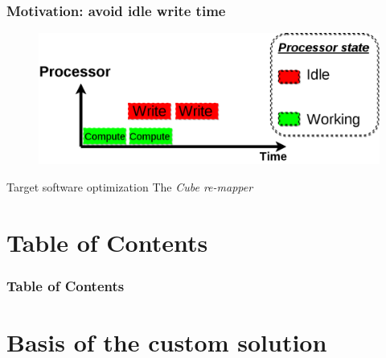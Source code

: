 \documentclass[slidestop,xcolor=dvipsnames, notes=hide]{beamer}
\newcommand{\toolTargetSoftware}			{\emph{Cube re-mapper}}
\begin{document}
	\begin{frame}
		\frametitle{Motivation: avoid idle write time}
		\center
		\begin{figure}
			\center
			\includegraphics[width=1\textwidth, height=0.6\textheight]{images/internship_juelich_cubeRemapper_pattern_ideal.png}
		\end{figure}
		
		\pause
		\begin{block}{Target software optimization}
			The \toolTargetSoftware
		\end{block}

	\end{frame}



\section*{Table of Contents}
\begin{frame}[fragile]
	\frametitle{Table of Contents}
	\tableofcontents
\end{frame}


\section{Basis of the custom solution}
\end{document}
